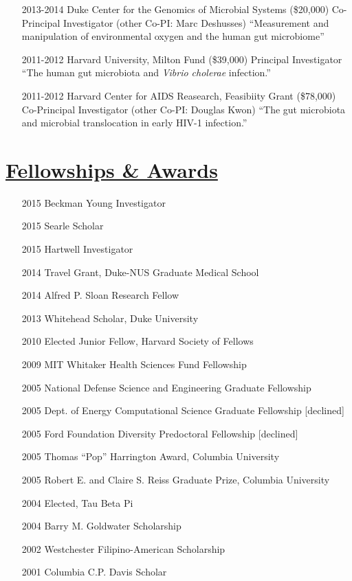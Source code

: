 \documentclass[overlapped,line,11pt]{res}
\begin{document}
\begin{resume}
\begin{itemize}[leftmargin=2cm, style=sameline]
\item[2013-2014] Duke Center for the Genomics of Microbial Systems
  (\$20,000) \newline Co-Principal Investigator (other Co-PI:
  Marc Deshusses) \newline ``Measurement and manipulation of
environmental oxygen and the human gut microbiome''

\item[2011-2012] Harvard University, Milton Fund (\$39,000) \newline
  Principal Investigator \newline ``The human gut microbiota
  and \emph{Vibrio cholerae} infection.''

\item[2011-2012] Harvard Center for AIDS Reasearch, Feasibiity Grant (\$78,000) \newline
  Co-Principal Investigator (other Co-PI: Douglas Kwon) \newline ``The gut microbiota and microbial
translocation in early HIV-1 infection.''

\end{itemize}

\section{\underline{\sc Fellowships \& Awards}} 
\vspace{.25in}

\begin{itemize}[leftmargin=1cm, style=sameline, itemsep=0mm]
\item[2015] Beckman Young Investigator
\item[2015] Searle Scholar
\item[2015] Hartwell Investigator
\item[2014] Travel Grant, Duke-NUS Graduate Medical School
\item[2014] Alfred P. Sloan Research Fellow %
\item[2013] Whitehead Scholar, Duke University%
\item[2010] Elected Junior Fellow, Harvard Society of Fellows%
\item[2009] MIT Whitaker Health Sciences Fund Fellowship %
\item[2005] National Defense Science and Engineering Graduate
  Fellowship
\item[2005] Dept. of Energy Computational Science Graduate Fellowship [declined]
\item[2005] Ford Foundation Diversity Predoctoral Fellowship [declined]
\item[2005] Thomas ``Pop'' Harrington Award, Columbia University
\item[2005] Robert E. and Claire S. Reiss Graduate Prize, Columbia University
\item[2004] Elected, Tau Beta Pi
\item[2004] Barry M. Goldwater Scholarship
\item[2002] Westchester Filipino-American Scholarship
\item[2001] Columbia C.P. Davis Scholar


\end{itemize}
\end{resume}
\end{document}
